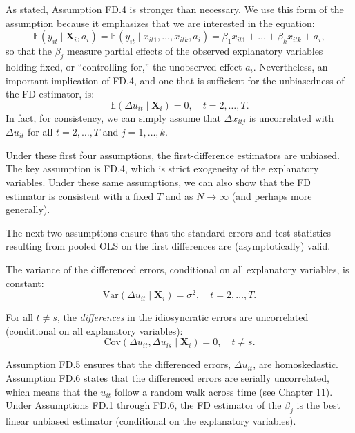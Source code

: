 \documentclass[a4paper, 10pt]{article}
\theoremstyle{definition}	%
\begin{document}
As stated, Assumption FD.4 is stronger than necessary. We use this form of the assumption because it emphasizes that we are interested in the equation:
\[
\mathbb{E}(y_{it} \mid \mathbf{X}_i, a_i) = \mathbb{E}(y_{it} \mid x_{it1}, \dots, x_{itk}, a_i) = \beta_1 x_{it1} + \dots + \beta_k x_{itk} + a_i,
\]
so that the \( \beta_j \) measure partial effects of the observed explanatory variables holding fixed, or “controlling for,” the unobserved effect \( a_i \).
Nevertheless, an important implication of FD.4, and one that is sufficient for the unbiasedness of the FD estimator, is:
\[
\mathbb{E}(\Delta u_{it} \mid \mathbf{X}_i) = 0, \quad t = 2, \dots, T.
\]
In fact, for consistency, we can simply assume that \( \Delta x_{itj} \) is uncorrelated with \( \Delta u_{it} \) for all \( t = 2, \dots, T \) and \( j = 1, \dots, k \).

Under these first four assumptions, the first-difference estimators are unbiased. The key assumption is FD.4, which is strict exogeneity of the explanatory variables. Under these same assumptions, we can also show that the FD estimator is consistent with a fixed \( T \) and as \( N \to \infty \) (and perhaps more generally).

The next two assumptions ensure that the standard errors and test statistics resulting from pooled OLS on the first differences are (asymptotically) valid.

\begin{tcolorbox}[colback=blue!5!white, colframe=blue!80!black, title=Assumption FD.5 (Homoskedasticity of Differenced Errors)]
The variance of the differenced errors, conditional on all explanatory variables, is constant:
\[
\text{Var}(\Delta u_{it} \mid \mathbf{X}_i) = \sigma^2, \quad t = 2, \dots, T.
\]
\end{tcolorbox}

\begin{tcolorbox}[colback=blue!5!white, colframe=blue!80!black, title=Assumption FD.6 (No Serial Correlation of Differenced Errors)]
For all \( t \ne s \), the \textit{differences} in the idiosyncratic errors are uncorrelated (conditional on all explanatory variables):
\[
\text{Cov}(\Delta u_{it}, \Delta u_{is} \mid \mathbf{X}_i) = 0, \quad t \ne s.
\]
\end{tcolorbox}
Assumption FD.5 ensures that the differenced errors, \( \Delta u_{it} \), are homoskedastic. Assumption FD.6 states that the differenced errors are serially uncorrelated, which means that the \( u_{it} \) follow a random walk across time (see Chapter 11). Under Assumptions FD.1 through FD.6, the FD estimator of the \( \beta_j \) is the best linear unbiased estimator (conditional on the explanatory variables).
\end{document}
